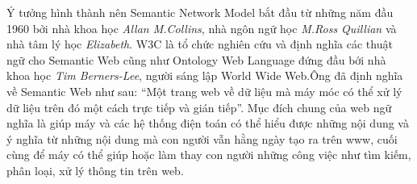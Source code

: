 Ý tưởng hình thành nên Semantic Network Model bắt đầu từ những năm đầu 1960 bởi nhà khoa học \textit{Allan M.Collins}, nhà ngôn ngữ học \textit{M.Ross Quillian} và nhà tâm lý học \textit{Elizabeth}. W3C là tổ chức nghiên cứu và định nghĩa các thuật ngữ cho Semantic Web cũng như Ontology Web Language đứng đầu bới nhà khoa học \textit{Tim Berners-Lee}, người sáng lập World Wide Web.Ông đã định nghĩa về Semantic Web như sau: “Một trang web về dữ liệu mà máy móc có thể xử lý dữ liệu trên đó một cách trực tiếp và gián tiếp”. Mục đích chung của web ngữ nghĩa là giúp máy và các hệ thống điện toán có thể hiểu được những nội dung và ý nghĩa từ những nội dung mà con người vẫn hằng ngày tạo ra trên www, cuối cùng để máy có thể giúp hoặc làm thay con người những công việc như tìm kiếm, phân loại, xử lý thông tin trên web.